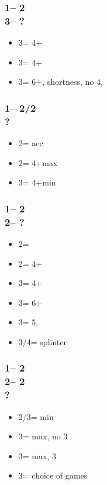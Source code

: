 \documentclass[12pt, a4paper]{article}
\begin{document}
\subsubsection*{1\nt -- 2\clubs\\
                3\clubs -- ?}
\begin{itemize}
    \item 3\diams = 4+\hearts
    \item 3\hearts = 4+\spades
    \item 3\spades = 6+\diams, \clubs shortness, no 4\major, \gf
\end{itemize}

\subsubsection*{1\nt -- 2\diams/2\hearts\\
                ?}
\begin{itemize}
    \item 2\major = acc
    \item 2\nt = 4+\major max
    \item 3\major = 4+\major min
\end{itemize}

\subsubsection*{1\nt -- 2\diams\\
                2\hearts -- ?}
\begin{itemize}
    \item 2\spades = \inv
    \item 2\nt = 4+\clubs\ \gf
    \item 3\clubs = 4+\diams\ \gf
    \item 3\diams = 6+\hearts\ \gf
    \item 3\hearts = 5\spades, \inv
    \item 3\spades/4\minor = splinter
\end{itemize}

\subsubsection*{1\nt -- 2\diams\\
                2\hearts -- 2\spades\\
                ?}
\begin{itemize}
    \item 2\nt/3\hearts = min
    \item 3\clubs = max, no 3\hearts
    \item 3\diams = max, 3\hearts
    \item 3\nt = choice of games
\end{itemize}
\end{document}
